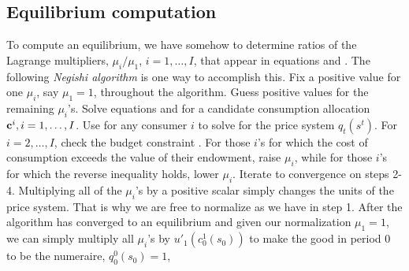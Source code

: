 %


\subsection{Equilibrium computation}\label{sec:Negishi}%
To compute an equilibrium, we have somehow to determine ratios of
the Lagrange multipliers, $\mu_i / \mu_1$, $i=1, \ldots, I $,
that appear in equations  and .  The following {\it
Negishi algorithm\/} is one way to accomplish this.
\medskip
{}  Fix a positive value for one $\mu_i$, say $\mu_1=1$,
throughout the algorithm.  Guess  positive values for the
remaining  $\mu_i$'s. 
\medskip
{}  
Solve  equations  and  for
a candidate consumption allocation ${\bf c}^i, i=1, \ldots, I$.
\medskip
{}  Use  for any consumer $i$ to solve for the
price system $q_t(s^t)$.
\medskip
{}  For $i =2, \ldots, I$, check the budget constraint
.  For those $i$'s for which the cost of consumption
exceeds the value of their endowment, raise $\mu_i$, while for
those $i$'s for which the reverse inequality holds, lower $\mu_i$.
\medskip {} Iterate to convergence on steps 2-4.
\medskip
\noindent Multiplying all of the $\mu_i$'s by a positive scalar
simply  changes the units of the price system. That is why we
are free to normalize as we have in step 1. After the
algorithm has converged to an equilibrium and given our
normalization $\mu_1=1$, we can simply multiply all
$\mu_i$'s by  $u'_1(c_0^1(s_0))$ to make the good in
period 0 to be the numeraire, $q^0_0(s_0)= 1$,


